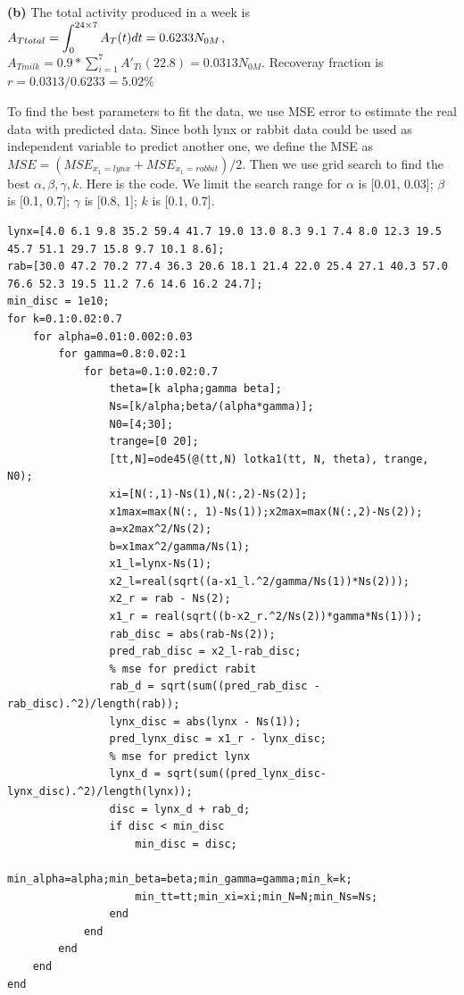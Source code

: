 \documentclass[12pt,a4paper]{article}
\begin{document}
\textbf{(b)} The total activity produced in a week is $A_{Ttotal}=\bint{0}{24\times 7}A_T(t)dt=0.6233N_{0M}$, $A_{Tmilk}=0.9*\sum_{i=1}^7A'_{Ti}(22.8)=0.0313N_{0M}$. Recoveray fraction is $r=0.0313/0.6233=5.02\%$

\newpage 
{}
To find the best parameters to fit the data, we use MSE error to estimate the real data with predicted data. Since both lynx or rabbit data could be used as independent variable to predict another one, we define the MSE as $MSE=(MSE_{x_1=lynx}+MSE_{x_1=rabbit})/2$. Then we use grid search to find the best $\alpha, \beta, \gamma, k$. Here is the code. We limit the search range for $\alpha$ is [0.01, 0.03]; $\beta$ is [0.1, 0.7]; $\gamma$ is [0.8, 1]; $k$ is [0.1, 0.7].  

\begin{lstlisting}
lynx=[4.0 6.1 9.8 35.2 59.4 41.7 19.0 13.0 8.3 9.1 7.4 8.0 12.3 19.5 45.7 51.1 29.7 15.8 9.7 10.1 8.6];
rab=[30.0 47.2 70.2 77.4 36.3 20.6 18.1 21.4 22.0 25.4 27.1 40.3 57.0 76.6 52.3 19.5 11.2 7.6 14.6 16.2 24.7];
min_disc = 1e10;
for k=0.1:0.02:0.7
    for alpha=0.01:0.002:0.03
        for gamma=0.8:0.02:1
            for beta=0.1:0.02:0.7
                theta=[k alpha;gamma beta];
                Ns=[k/alpha;beta/(alpha*gamma)];
                N0=[4;30];
                trange=[0 20];
                [tt,N]=ode45(@(tt,N) lotka1(tt, N, theta), trange, N0);
                xi=[N(:,1)-Ns(1),N(:,2)-Ns(2)];
                x1max=max(N(:, 1)-Ns(1));x2max=max(N(:,2)-Ns(2));
                a=x2max^2/Ns(2);
                b=x1max^2/gamma/Ns(1);
                x1_l=lynx-Ns(1);
                x2_l=real(sqrt((a-x1_l.^2/gamma/Ns(1))*Ns(2)));
                x2_r = rab - Ns(2);
                x1_r = real(sqrt((b-x2_r.^2/Ns(2))*gamma*Ns(1)));
                rab_disc = abs(rab-Ns(2));
                pred_rab_disc = x2_l-rab_disc;
                % mse for predict rabit
                rab_d = sqrt(sum((pred_rab_disc - rab_disc).^2)/length(rab));
                lynx_disc = abs(lynx - Ns(1));
                pred_lynx_disc = x1_r - lynx_disc;
                % mse for predict lynx
                lynx_d = sqrt(sum((pred_lynx_disc-lynx_disc).^2)/length(lynx));
                disc = lynx_d + rab_d;
                if disc < min_disc
                    min_disc = disc;
                    min_alpha=alpha;min_beta=beta;min_gamma=gamma;min_k=k;
                    min_tt=tt;min_xi=xi;min_N=N;min_Ns=Ns;
                end
            end
        end
    end
end
\end{lstlisting}
\end{document}
